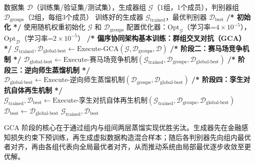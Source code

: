 \begin{algorithm}[H]
\caption{PCA框架总体训练流程}
\label{alg:mgca}
\begin{algorithmic}[0]
\Require 数据集 $\mathcal{D}$（训练集/验证集/测试集），生成器组 $\mathcal{G}$（1组，1个成员），判别器组 $\mathcal{D}_{\text{groups}}$（2组，每组3个成员）
\Ensure 训练好的生成器 $\mathcal{G}_{\text{trained}}$，最优判别器 $\mathcal{D}_{\text{best}}$
\Statex
\State \textbf{/* 初始化 */}
\State 使用随机权重初始化 $\mathcal{G}$ 和 $\mathcal{D}_{\text{groups}}$
\State 配置优化器：$\text{Opt}_{\mathcal{G}}$（学习率=$4\times10^{-5}$），$\text{Opt}_{\mathcal{D}}$（学习率=$2\times10^{-5}$）
\Statex
\State \textbf{/* 偏序协同架构基本训练：群组交叉对抗（GCA） */}
\State $\mathcal{G}_{\text{trained}}, \mathcal{D}_{\text{global-best}} \gets \text{Execute-GCA}(\mathcal{G}, \mathcal{D}_{\text{groups}}, \mathcal{D})$
\Statex
\State \textbf{/* 阶段二：赛马场竞争机制 */}
  \State $\mathcal{D}_{\text{global-best}} \gets \text{Execute-赛马场竞争机制}(\mathcal{G}_{\text{trained}}, \mathcal{D}_{\text{groups}}, \mathcal{D}_{\text{global-best}})$
\EndIf
\Statex
\State \textbf{/* 阶段三：逆向师生蒸馏机制 */}
  \State $\mathcal{D}_{\text{global-best}} \gets \text{Execute-逆向师生蒸馏机制}(\mathcal{D}_{\text{groups}}, \mathcal{D}_{\text{global-best}})$
\EndIf
\Statex
\State \textbf{/* 阶段四：孪生对抗自体再生机制 */}
  \State $\mathcal{G}_{\text{trained}}, \mathcal{D}_{\text{best}} \gets \text{Execute-孪生对抗自体再生机制}(\mathcal{G}_{\text{trained}}, \mathcal{D}_{\text{groups}}, \mathcal{D}_{\text{global-best}})$
\Else
  \State $\mathcal{D}_{\text{best}} \gets \mathcal{D}_{\text{global-best}}$
\EndIf
\Statex
\State \Return $\mathcal{G}_{\text{trained}}, \mathcal{D}_{\text{best}}$
\end{algorithmic}
\end{algorithm}

% 

GCA 阶段的核心在于通过组内与组间两层蒸馏实现优胜劣汰。生成器先在金融感知损失约束下预训练，再生成虚拟数据构造混合样本；随后各判别器先向组内最优者对齐，再由各组代表向全局最优者对齐，从而推动系统由局部最优逐步收敛至更优解。

